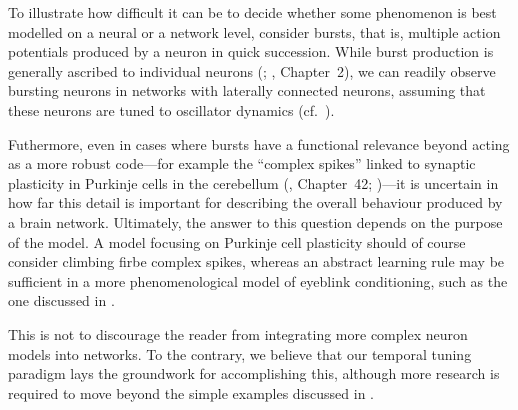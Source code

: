 To illustrate how difficult it can be to decide whether some phenomenon is best modelled on a neural or a network level, consider bursts, that is, multiple action potentials produced by a neuron in quick succession.
While burst production is generally ascribed to individual neurons (; \cite{kandel2012principles}, Chapter~2), we can readily observe bursting neurons in \NEF networks with laterally connected \LIF neurons, assuming that these neurons are tuned to oscillator dynamics (cf.~).

Futhermore, even in cases where bursts have a functional relevance beyond acting as a more robust code---for example the \enquote{complex spikes} linked to synaptic plasticity in Purkinje cells in the cerebellum (\cite{kandel2012principles}, Chapter~42; \cite{richards2019dendritic})---it is uncertain in how far this detail is important for describing the overall behaviour produced by a brain network.
Ultimately, the answer to this question depends on the purpose of the model.
A model focusing on Purkinje cell plasticity should of course consider climbing firbe complex spikes, whereas an abstract learning rule may be sufficient in a more phenomenological model of eyeblink conditioning, such as the one discussed in .

This is not to discourage the reader from integrating more complex neuron models into \NEF networks.
To the contrary, we believe that our temporal tuning paradigm lays the groundwork for accomplishing this, although more research is required to move beyond the simple examples discussed in .

